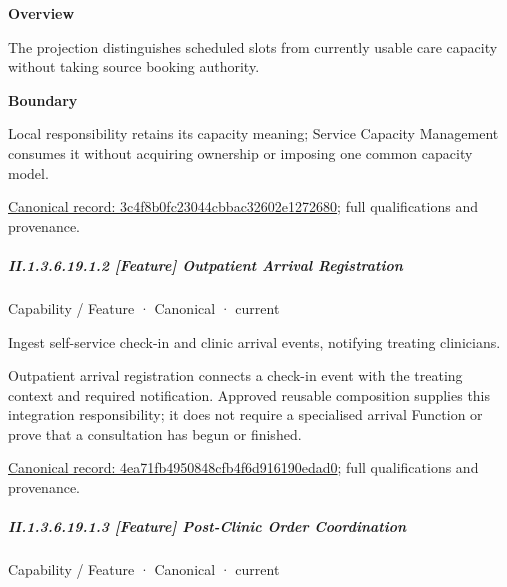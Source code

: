 \textbf{Overview}



The projection distinguishes scheduled slots from currently usable care capacity without taking source booking authority.



\textbf{Boundary}



Local responsibility retains its capacity meaning; Service Capacity Management consumes it without acquiring ownership or imposing one common capacity model.


{\footnotesize \href{../../../../../../../continuum/strategy/capability/feature/3c4f8b0fc23044cbbac32602e1272680.md}{Canonical record: 3c4f8b0fc23044cbbac32602e1272680}; full qualifications and provenance.}\par
\subparagraph*{II.1.3.6.19.1.2 [Feature] Outpatient Arrival Registration}
\label{navigation:II.1.3.6.19.1.2}

\label{element:4ea71fb4950848cfb4f6d916190edad0}
{\small Capability / Feature · Canonical · current}\par

Ingest self-service check-in and clinic arrival events, notifying treating clinicians.



Outpatient arrival registration connects a check-in event with the treating context and required notification. Approved reusable composition supplies this integration responsibility; it does not require a specialised arrival Function or prove that a consultation has begun or finished.


{\footnotesize \href{../../../../../../../continuum/strategy/capability/feature/4ea71fb4950848cfb4f6d916190edad0.md}{Canonical record: 4ea71fb4950848cfb4f6d916190edad0}; full qualifications and provenance.}\par
\subparagraph*{II.1.3.6.19.1.3 [Feature] Post-Clinic Order Coordination}
\label{navigation:II.1.3.6.19.1.3}

\label{element:439b3530b7c9443ab3e48d2cc50a3b0c}
{\small Capability / Feature · Canonical · current}\par

